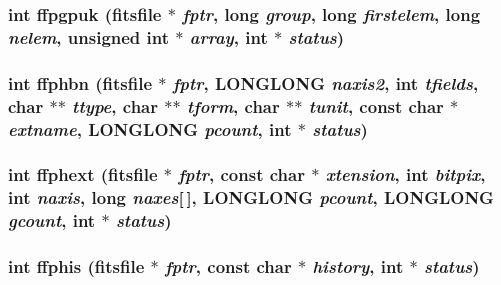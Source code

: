 \subsubsection{\setlength{\rightskip}{0pt plus 5cm}int ffpgpuk (\bf{fitsfile} $\ast$ {\em fptr}, long {\em group}, long {\em firstelem}, long {\em nelem}, unsigned int $\ast$ {\em array}, int $\ast$ {\em status})}\label{test_2roimasker_2fitsio_8h_c2f5e0ecd6a8e45255cf730ab2a15f09}


\subsubsection{\setlength{\rightskip}{0pt plus 5cm}int ffphbn (\bf{fitsfile} $\ast$ {\em fptr}, \bf{LONGLONG} {\em naxis2}, int {\em tfields}, char $\ast$$\ast$ {\em ttype}, char $\ast$$\ast$ {\em tform}, char $\ast$$\ast$ {\em tunit}, const char $\ast$ {\em extname}, \bf{LONGLONG} {\em pcount}, int $\ast$ {\em status})}\label{test_2roimasker_2fitsio_8h_a8f74cde55dda30752adf41a2dc20af4}


\subsubsection{\setlength{\rightskip}{0pt plus 5cm}int ffphext (\bf{fitsfile} $\ast$ {\em fptr}, const char $\ast$ {\em xtension}, int {\em bitpix}, int {\em naxis}, long {\em naxes}[$\,$], \bf{LONGLONG} {\em pcount}, \bf{LONGLONG} {\em gcount}, int $\ast$ {\em status})}\label{test_2roimasker_2fitsio_8h_f27450c869fa355247522a3769bd1013}


\subsubsection{\setlength{\rightskip}{0pt plus 5cm}int ffphis (\bf{fitsfile} $\ast$ {\em fptr}, const char $\ast$ {\em history}, int $\ast$ {\em status})}\label{test_2roimasker_2fitsio_8h_2634330d947ba82006719202dac74b14}


